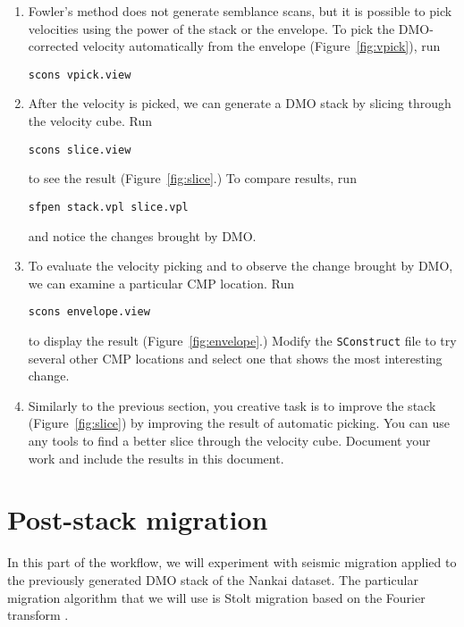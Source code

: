 \begin{enumerate}
\item Fowler's method does not generate semblance scans, but it is possible to pick velocities using the 
power of the stack or the envelope. To pick the DMO-corrected velocity automatically from the envelope 
(Figure~\ref{fig:vpick}), run
\begin{verbatim}
scons vpick.view
\end{verbatim}
\item After the velocity is picked, we can generate a DMO stack by slicing through the velocity cube. 
Run
\begin{verbatim}
scons slice.view
\end{verbatim}
to see the result (Figure~\ref{fig:slice}.)
To compare results, run
\begin{verbatim}
sfpen stack.vpl slice.vpl
\end{verbatim}
and notice the changes brought by DMO. 
\item To evaluate the velocity picking and to observe the change brought by DMO, we can examine a particular CMP location. Run
\begin{verbatim}
scons envelope.view
\end{verbatim}
to display the result (Figure~\ref{fig:envelope}.)
Modify the \texttt{SConstruct} file to try several other CMP locations and select one that shows the most interesting change.
\item Similarly to the previous section, you creative task is to improve the stack (Figure~\ref{fig:slice}) 
by improving the result of automatic picking. You can use any tools to find a better slice through the velocity cube. 
Document your work and include the results in this document.

\answer{%

}
\end{enumerate}


\section{Post-stack migration}

In this part of the workflow, we will experiment with seismic migration applied to the previously generated 
DMO stack of the Nankai dataset. The particular migration algorithm that we will use is Stolt migration based 
on the Fourier transform \cite[]{GEO50-11-22192244}.

